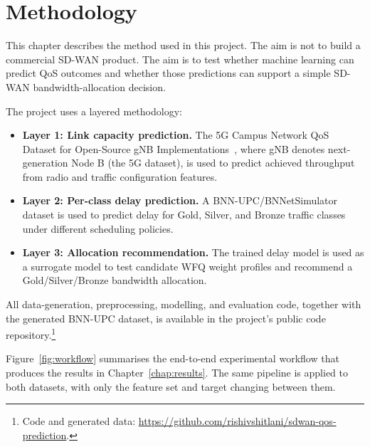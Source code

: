 \documentclass[a4paper,12pt]{Classes/RoboticsLaTeX}
\begin{document}
\chapter{Methodology}
\label{chap:methodology}

This chapter describes the method used in this project. The aim is not to build a commercial SD-WAN product. The aim is to test whether machine learning can predict QoS outcomes and whether those predictions can support a simple SD-WAN bandwidth-allocation decision.

The project uses a layered methodology:

\begin{itemize}
    \item \textbf{Layer 1: Link capacity prediction.} The 5G Campus Network QoS Dataset for Open-Source gNB Implementations~\cite{raffeck2024zenodo}, where gNB denotes next-generation Node B (the 5G dataset), is used to predict achieved throughput from radio and traffic configuration features.
    \item \textbf{Layer 2: Per-class delay prediction.} A BNN-UPC/BNNetSimulator~\cite{ferriolgalmes2022routenetfermi} dataset is used to predict delay for Gold, Silver, and Bronze traffic classes under different scheduling policies.
    \item \textbf{Layer 3: Allocation recommendation.} The trained delay model is used as a surrogate model to test candidate WFQ weight profiles and recommend a Gold/Silver/Bronze bandwidth allocation.
\end{itemize}

All data-generation, preprocessing, modelling, and evaluation code, together with the generated BNN-UPC dataset, is available in the project's public code repository.\footnote{Code and generated data: \url{https://github.com/rishivshitlani/sdwan-qos-prediction}.}

Figure~\ref{fig:workflow} summarises the end-to-end experimental workflow that produces the results in Chapter~\ref{chap:results}. The same pipeline is applied to both datasets, with only the feature set and target changing between them.
\end{document}
